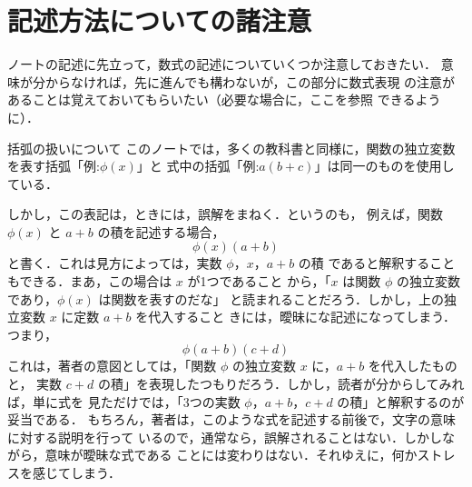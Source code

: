 ﻿\section*{記述方法についての諸注意}
    \begin{mycomment}
        ノートの記述に先立って，数式の記述についていくつか注意しておきたい．
        意味が分からなければ，先に進んでも構わないが，この部分に数式表現
        の注意があることは覚えておいてもらいたい（必要な場合に，ここを参照
        できるように）．
    \end{mycomment}


    \begin{preattention}{括弧の扱いについて}
        このノートでは，多くの教科書と同様に，関数の独立変数を表す括弧「例:$\phi(x)$」と
        式中の括弧「例:$a(b+c)$」は同一のものを使用している．

        しかし，この表記は，ときには，誤解をまねく．というのも，
        例えば，関数 $\phi(x)$ と $a+b$ の積を記述する場合，
            \begin{equation*}
                \phi(x) (a+b)
            \end{equation*}
        と書く．これは見方によっては，実数 $\phi$，$x$，$a+b$ の積
        であると解釈することもできる．まあ，この場合は $x$ が1つであること
        から，「$x$ は関数 $\phi$ の独立変数であり，$\phi(x)$ は関数を表すのだな」
        と読まれることだろう．しかし，上の独立変数 $x$ に定数 $a+b$ を代入すること
        きには，曖昧にな記述になってしまう．つまり，
            \begin{equation*}
                \phi(a+b) (c+d)
            \end{equation*}
        これは，著者の意図としては，「関数 $\phi$ の独立変数 $x$ に，$a+b$ を代入したものと，
        実数 $c+d$ の積」を表現したつもりだろう．しかし，読者が分からしてみれば，単に式を
        見ただけでは，「3つの実数 $\phi$，$a+b$，$c+d$ の積」と解釈するのが妥当である．
        もちろん，著者は，このような式を記述する前後で，文字の意味に対する説明を行って
        いるので，通常なら，誤解されることはない．しかしながら，意味が曖昧な式である
        ことには変わりはない．それゆえに，何かストレスを感じてしまう．


\end{preattention}
